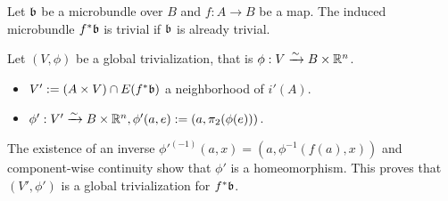 \begin{mylemma}\label{induced::trivial}
    Let $\mathfrak{b}$ be a microbundle over $B$ and $f: A \to B$ be a map.
    The induced microbundle $f^*\mathfrak{b}$ is trivial if $\mathfrak{b}$ is already trivial.
\end{mylemma}
\begin{myproof}
Let $(V, \phi)$ be a global trivialization, that is $\phi: V \xrightarrow{\sim} B \times \mathbb{R}^n$.
\begin{itemize}
    \item $V' := (A \times V) \cap E(f^*\mathfrak{b})$ a neighborhood of $i'(A)$.
    \item $\phi': V' \xrightarrow{\sim} B \times \mathbb{R}^n, \phi'(a, e) := (a, \pi_2(\phi(e)))$.
\end{itemize}
The existence of an inverse $\phi'^{(-1)}(a, x) = (a, \phi^{-1}(f(a), x))$ and component-wise continuity show that $\phi'$ is a homeomorphism.
This proves that $(V', \phi')$ is a global trivialization for $f^*\mathfrak{b}$. 
\end{myproof}